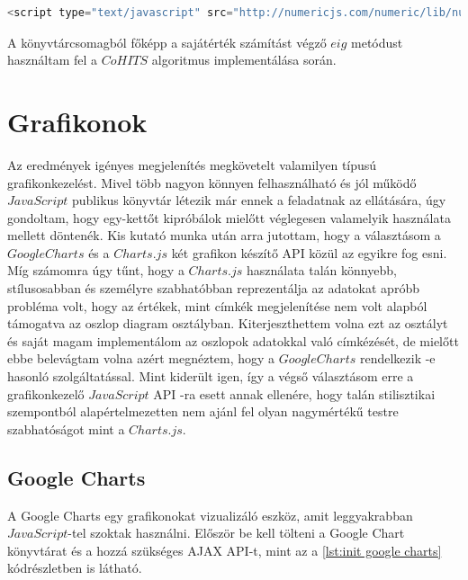 \documentclass[12pt]{report}
\theoremstyle{definition}
\begin{document}
	\noindent\begin{minipage}{\linewidth}
		\begin{lstlisting}[language=php,label={lst:include numeric}, caption={Numeric Javascript betöltése}]
<script type="text/javascript" src="http://numericjs.com/numeric/lib/numeric-1.2.6.min.js"></script>
		\end{lstlisting}
	\end{minipage} 
	
	A könyvtárcsomagból főképp a sajátérték számítást végző $eig$ metódust használtam fel a $CoHITS$ algoritmus implementálása során.
	
	\section{Grafikonok}
	Az eredmények igényes megjelenítés megkövetelt valamilyen típusú grafikonkezelést. Mivel több nagyon könnyen felhasználható és jól működő $JavaScript$ publikus könyvtár létezik már ennek a feladatnak az ellátására, úgy gondoltam, hogy egy-kettőt kipróbálok mielőtt véglegesen valamelyik használata mellett döntenék. Kis kutató munka után arra jutottam, hogy a választásom a $Google Charts$ \cite{Google Charts homepage} és a $Charts.js$ \cite{Charts.js homepage} két grafikon készítő API közül az egyikre fog esni. Míg számomra úgy tűnt, hogy a $Charts.js$ használata talán könnyebb, stílusosabban és személyre szabhatóbban reprezentálja az adatokat apróbb probléma volt, hogy az értékek, mint címkék megjelenítése nem volt alapból támogatva az oszlop diagram osztályban. Kiterjeszthettem volna ezt az osztályt és saját magam implementálom az oszlopok adatokkal való címkézését, de mielőtt ebbe belevágtam volna azért megnéztem, hogy a $Google Charts$ rendelkezik -e hasonló szolgáltatással. Mint kiderült igen, így a végső választásom erre a grafikonkezelő $JavaScript$ API -ra esett annak ellenére, hogy talán stilisztikai szempontból alapértelmezetten nem ajánl fel olyan nagymértékű testre szabhatóságot mint a $Charts.js$.
	
	\subsection{Google Charts}
	
	A Google Charts egy grafikonokat vizualizáló eszköz, amit leggyakrabban $JavaScript$-tel szoktak használni. Először be kell tölteni a Google Chart könyvtárat és a hozzá szükséges AJAX API-t, mint az a \ref{lst:init google charts} kódrészletben is látható.
	
\end{document}
